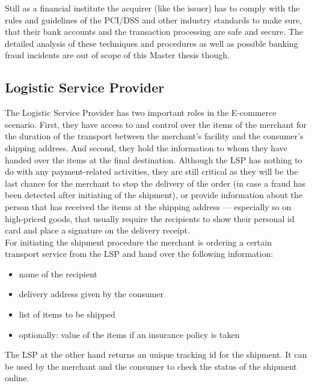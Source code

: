Still as a financial institute the acquirer (like the issuer) has to comply with the rules and guidelines of the \gls{PCI/DSS} and other industry standards to make sure, that their bank accounts and the transaction processing are safe and secure. The detailed analysis of these techniques and procedures as well as possible banking fraud incidents are out of scope of this Master thesis though.


\subsection{Logistic Service Provider}
\label{subsec:stakeholder_lsp}

The Logistic Service Provider has two important roles in the \gls{E-commerce} scenario. First, they have access to and control over the items of the merchant for the duration of the transport between the merchant's facility and the consumer's shipping address. And second, they hold the information to whom they have handed over the items at the final destination. Although the \gls{LSP} has nothing to do with any payment-related activities, they are still critical as they will be the last chance for the merchant to stop the delivery of the order (in case a fraud has been detected after initiating of the shipment), or provide information about the person that has received the items at the shipping address --- especially so on high-priced goods, that usually require the recipients to show their personal id card and place a signature on the delivery receipt. \\

For initiating the shipment procedure the merchant is ordering a certain transport service from the \gls{LSP} and hand over the following information:\@

\begin{itemize}
	\item name of the recipient
	\item delivery address given by the consumer
	\item list of items to be shipped
	\item optionally: value of the items if an insurance policy is taken
\end{itemize}

The \gls{LSP} at the other hand returns an unique tracking id for the shipment. It can be used by the merchant and the consumer to check the status of the shipment online. \\

